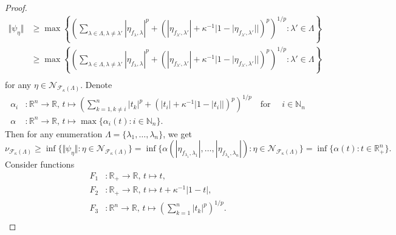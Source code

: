 \documentclass[12pt]{article}
\begin{document}
\begin{proof}
\[\begin{aligned}
        \Vert \psi_{\eta}\Vert
        &\geq\max\left\{
            \left(
                \sum_{\lambda\in\Lambda,\lambda\neq \lambda'}
                    |\eta_{f_\lambda,\lambda}|^p+
                    (
                        |\eta_{f_{\lambda'},\lambda'}|+
                        \kappa^{-1}|1-|\eta_{f_{\lambda'},\lambda'}||
                    )^p
            \right)^{1/p}:
            \lambda'\in\Lambda
        \right\} \\
        &\geq\max\left\{
            \left(
                \sum_{\lambda\in\Lambda,\lambda\neq \lambda'} 
                    |\eta_{f_\lambda,\lambda}|^p+
                    (
                        |\eta_{f_{\lambda'},\lambda'}|+
                        \kappa^{-1}|1-|\eta_{f_{\lambda'},\lambda'}||
                    )^p
            \right)^{1/p}:
            \lambda'\in\Lambda
        \right\} \\
    \end{aligned}
    \]
    for any $\eta\in\mathcal{N}_{\mathcal{F}_{\kappa}(\Lambda)}$. Denote
    \[
    \begin{aligned}
        \alpha_i&:\mathbb{R}^n\to\mathbb{R},\,
        t\mapsto \left(
            \sum_{k=1,k\neq i}^n |t_k|^p+(|t_i|+\kappa^{-1}|1-|t_i||)^p
        \right)^{1/p} \quad\text{for }\quad i\in\mathbb{N}_n \\
        \alpha&:\mathbb{R}^n\to\mathbb{R},\,
        t\mapsto\max\{\alpha_i(t):i\in\mathbb{N}_n\}.
    \end{aligned}
    \]
    Then for any enumeration $\Lambda=\{\lambda_1,\ldots,\lambda_n\}$, we get
    \[
        \nu_{\mathcal{F}_{\kappa}(\Lambda)}
        \geq\inf\{
            \Vert \psi_{\eta}\Vert : 
            \eta\in\mathcal{N}_{\mathcal{F}_{\kappa}(\Lambda)}
        \}
        =\inf\{
            \alpha(
                |\eta_{f_{\lambda_1},\lambda_1}|,
                \ldots,
                |\eta_{f_{\lambda_n},\lambda_n}|
            ) : 
            \eta\in\mathcal{N}_{\mathcal{F}_{\kappa}(\Lambda)}
        \}
        =\inf\{\alpha(t) : t\in\mathbb{R}_+^n\}.
    \]
    Consider functions
    \[
    \begin{aligned}
        F_1&:\mathbb{R}_+\to\mathbb{R},\, 
            t\mapsto t, \\
        F_2&:\mathbb{R}_+\to\mathbb{R},\, 
            t\mapsto t+\kappa^{-1}|1-t|, \\
        F_3&:\mathbb{R}^n\to\mathbb{R},\, t\mapsto 
            \left(\sum_{k=1}^n|t_k|^p\right)^{1/p}. \\
    \end{aligned}
\]
\end{proof}
\end{document}
